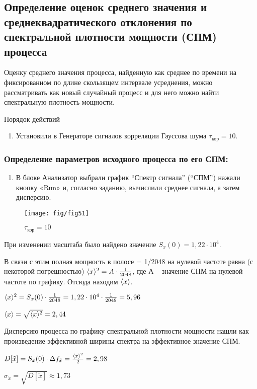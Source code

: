 \documentclass[a4paper,14pt]{extarticle}
\begin{document}
\subsection[Задание 5]{Определение оценок среднего значения и среднеквадратического отклонения по спектральной плотности мощности (СПМ) процесса}
Оценку среднего значения процесса, найденную как среднее по времени на фиксированном по длине скользящем интервале усреднения, можно рассматривать как новый случайный процесс и для него можно найти спектральную плотность мощности.

Порядок действий
\begin{enumerate}
	\item Установили в Генераторе сигналов корреляции Гауссова шума $\tau_\text{кор}=10$.
\end{enumerate}
\subsubsection[Задание 5.1]{Определение параметров исходного процесса по его СПМ:}
\begin{enumerate}
	\item В блоке Анализатор выбрали график “Спектр сигнала” (“СПМ”) нажали кнопку «Run» и, согласно заданию, вычислили среднее сигнала, а затем дисперсию.
\end{enumerate}

\begin{figure}[H]
	\centering
    \texttt{[image: fig/fig51]}
	\caption*{$\tau_\text{кор} = 10$}
\end{figure}	


При изменении масштаба было найдено значение $S_x(0)=1,22\cdot 10^4$.

В связи с этим полная мощность в полосе  = 1/2048 на нулевой частоте равна (с некоторой погрешностью) $\langle x\rangle^2 = A\cdot \frac{1}{2048}$, где $А$ – значение СПМ на нулевой частоте по графику. Отсюда находим $\langle x\rangle$.

$\langle x\rangle^2 = S_x(0)\cdot \frac{1}{2048}= 1,22\cdot 10^4\cdot \frac{1}{2048} = 5,96$

$\langle x\rangle =  \sqrt{\langle x\rangle^2} = 2,44$

Дисперсию процесса по графику спектральной плотности мощности нашли как произведение эффективной ширины спектра на эффективное значение СПМ.

$D[\tilde{x}] = S_x(0)\cdot \Delta f_{\tilde{x}} =\frac{\langle x\rangle^2}{2} = 2,98$

$\sigma_{\tilde{x}} = \sqrt{D[\tilde{x}]}\approx 1,73$
\end{document}
